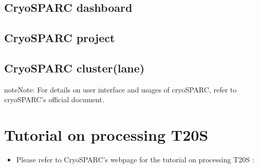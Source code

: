 \documentclass[a4paper,10pt,english]{sphinxmanual}
\begin{document}


\subsection{CryoSPARC dashboard}
\label{\detokenize{cryoSPARC:cryosparc-dashboard}}


\subsection{CryoSPARC project}
\label{\detokenize{cryoSPARC:cryosparc-project}}


\subsection{CryoSPARC cluster(lane)}
\label{\detokenize{cryoSPARC:cryosparc-cluster-lane}}

\begin{sphinxadmonition}{note}{Note:}
\sphinxAtStartPar
For details on user interface and usages of cryoSPARC, refer to cryoSPARC’s official document.
\end{sphinxadmonition}


\section{Tutorial on processing T20S}
\label{\detokenize{cryoSPARC:tutorial-on-processing-t20s}}\begin{itemize}
\item {} 
\sphinxAtStartPar
Please refer to CryoSPARC’s webpage for the tutorial on processing T20S : 

\end{itemize}
\end{document}

